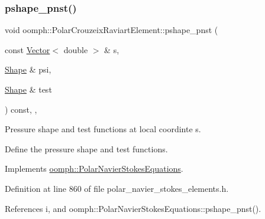 \mbox{\label{classoomph_1_1PolarCrouzeixRaviartElement_a919b450ac1bb494ca96b94b717a9a37b}} 
\subsubsection{\texorpdfstring{pshape\+\_\+pnst()}{pshape\_pnst()}\hspace{0.1cm}{\footnotesize\ttfamily [2/2]}}
{\footnotesize\ttfamily void oomph\+::\+Polar\+Crouzeix\+Raviart\+Element\+::pshape\+\_\+pnst (\begin{DoxyParamCaption}\item[{const \hyperlink{classoomph_1_1Vector}{Vector}$<$ double $>$ \&}]{s,  }\item[{\hyperlink{classoomph_1_1Shape}{Shape} \&}]{psi,  }\item[{\hyperlink{classoomph_1_1Shape}{Shape} \&}]{test }\end{DoxyParamCaption}) const\hspace{0.3cm}{\ttfamily [inline]}, {\ttfamily [protected]}, {\ttfamily [virtual]}}



Pressure shape and test functions at local coordinte s. 

Define the pressure shape and test functions. 

Implements \hyperlink{classoomph_1_1PolarNavierStokesEquations_a2ec5597d86a5f93615d4a29f0a01ebf7}{oomph\+::\+Polar\+Navier\+Stokes\+Equations}.



Definition at line 860 of file polar\+\_\+navier\+\_\+stokes\+\_\+elements.\+h.



References i, and oomph\+::\+Polar\+Navier\+Stokes\+Equations\+::pshape\+\_\+pnst().

\mbox{\label{classoomph_1_1PolarCrouzeixRaviartElement_a36edbd6c9a877d4da2c99d5e70691c34}} 
